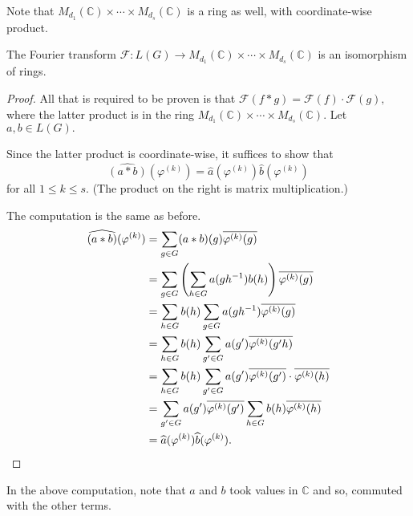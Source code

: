 Note that $M_{d_1}(\mathbb{C}) \times \cdots \times M_{d_s}(\mathbb{C})$ is a ring as well, with coordinate-wise product.

\begin{thm}[Wedderburn]
    The Fourier transform $\mathcal{F} : L(G) \to M_{d_1}(\mathbb{C}) \times \cdots \times M_{d_s}(\mathbb{C})$ is an isomorphism of rings.
\end{thm}
\begin{proof} 
    All that is required to be proven is that $\mathcal{F}(f * g) = \mathcal{F}(f) \cdot \mathcal{F}(g),$ where the latter product is in the ring $M_{d_1}(\mathbb{C}) \times \cdots \times M_{d_s}(\mathbb{C}).$ Let $a, b \in L(G).$

    Since the latter product is coordinate-wise, it suffices to show that
    \begin{equation*} 
        \widehat{(a * b)}(\varphi^{(k)}) = \widehat{a}(\varphi^{(k)})\widehat{b}(\varphi^{(k)})
    \end{equation*}
    for all $1 \le k \le s.$ (The product on the right is matrix multiplication.)

    The computation is the same as before.
    \begin{align*} 
        \widehat{(a * b)}(\varphi^{(k)}) &= \sum_{g \in G} (a * b)(g)\overline{\varphi^{(k)}(g)}\\
        &= \sum_{g \in G}\left(\sum_{h \in G}a(gh^{-1})b(h)\right)\overline{\varphi^{(k)}(g)}\\
        &= \sum_{h \in G}b(h)\sum_{g \in G}a(gh^{-1})\overline{\varphi^{(k)}(g)}\\
        &= \sum_{h \in G}b(h)\sum_{g' \in G}a(g')\overline{\varphi^{(k)}(g'h)}\\
        &= \sum_{h \in G}b(h)\sum_{g' \in G}a(g')\overline{\varphi^{(k)}(g')}\cdot\overline{\varphi^{(k)}(h)}\\
        &= \sum_{g' \in G}a(g')\overline{\varphi^{(k)}(g')}\sum_{h \in G}b(h)\overline{\varphi^{(k)}(h)}\\
        &= \widehat{a}(\varphi^{(k)})\widehat{b}(\varphi^{(k)}). \qedhere
    \end{align*}
\end{proof}
In the above computation, note that $a$ and $b$ took values in $\mathbb{C}$ and so, commuted with the other terms.